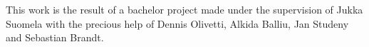 This work is the result of a bachelor project made under the supervision of Jukka Suomela with the precious help of Dennis Olivetti, Alkida Balliu, Jan Studeny and Sebastian Brandt.